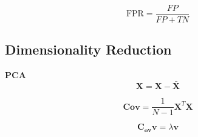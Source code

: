 \documentclass[8pt]{article}
\begin{document}
\begin{multicols}{2}
\begin{equation}
    \text{FPR} = \frac{FP}{FP + TN}
\end{equation}

\subsection*{Dimensionality Reduction}
\textbf{PCA}
\begin{equation}
    \mathbf{X} = \mathbf{X} - \bar{\mathbf{X}}
\end{equation}

\begin{equation}
    \mathbf{Cov} = \frac{1}{N - 1} \mathbf{X}^T \mathbf{X}
\end{equation}

\begin{equation}
    \mathbf{C_{ov}} \mathbf{v} = \lambda \mathbf{v}
\end{equation}

\end{multicols}
\end{document}
